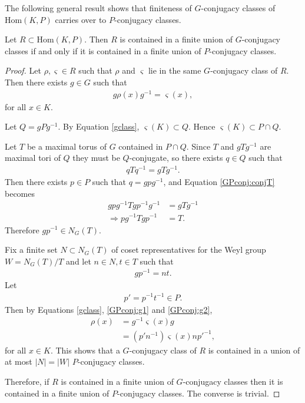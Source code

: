 The following general result shows that finiteness of $G$-conjugacy classes of $\mathrm{Hom}(K, P)$ carries over to $P$-conjugacy classes. 
\begin{lemma} Let $R \subset \mathrm{Hom}(K, P)$. Then $R$ is contained in a finite union of $G$-conjugacy classes if and only if it is contained in a finite union of $P$-conjugacy classes.
  \label{lem:GPconj}
\end{lemma}
\begin{proof}
	Let $\rho, \varsigma \in R$ such that $\rho$ and $\varsigma$ lie in the same $G$-conjugacy class of $R$. Then there exists $g\in G$ such that
	\begin{align} \label{gclass}
		g \rho(x) g^{-1} = \varsigma(x),
	\end{align}
for all $x \in K$.
	
	Let $Q = gPg^{-1}$. By Equation \ref{gclass}, $\varsigma(K) \subset Q$. Hence $\varsigma(K) \subset P \cap Q$.
	
	Let $T$ be a maximal torus of $G$ contained in $P\cap Q$. Since $T$ and $gTg^{-1}$ are maximal tori of $Q$ they must be $Q$-conjugate, so there exists $q\in Q$ such that
	\begin{align} \label{GPconj:conjT}
		qTq^{-1} = gTg^{-1}.
	\end{align}
	Then there exists $p\in P$ such that $q = gpg^{-1}$, and Equation \ref{GPconj:conjT} becomes
	\begin{align*}
		gpg^{-1}Tgp^{-1}g^{-1} &= gTg^{-1} \\
		\Rightarrow pg^{-1}Tgp^{-1} &= T.
	\end{align*}
	Therefore $gp^{-1} \in N_G(T)$. 

	Fix a finite set $N \subset N_G(T)$ of coset representatives for the Weyl group $W = N_G(T)/T$ and let $n \in N, t \in T$ such that
	\begin{align} \label{GPconj:g1}
		gp^{-1} = nt.
	\end{align}
	Let \begin{align} \label{GPconj:g2} p' = p^{-1}t^{-1} \in P. \end{align} Then by Equations \ref{gclass}, \ref{GPconj:g1} and \ref{GPconj:g2},
	\begin{align*}
		\rho(x) &= g^{-1} \varsigma(x) g\\
		&= (p'n^{-1}) \varsigma(x) np'^{-1},
	\end{align*}
	for all $x \in K$.
	This shows 
	that a $G$-conjugacy class of $R$ is contained in a union of at most $|N| = |W|$ $P$-conjugacy classes.

	Therefore, if $R$ is contained in a finite union of $G$-conjugacy classes then it is contained in a finite union of $P$-conjugacy classes. The converse is trivial.
\end{proof}



